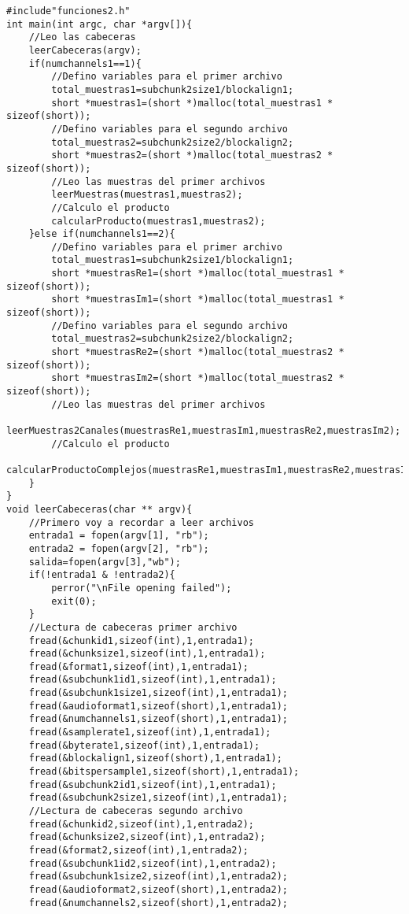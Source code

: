 \begin{lstlisting}[style=CStyle]
#include"funciones2.h"
int main(int argc, char *argv[]){
	//Leo las cabeceras
	leerCabeceras(argv);
	if(numchannels1==1){
		//Defino variables para el primer archivo
		total_muestras1=subchunk2size1/blockalign1;
		short *muestras1=(short *)malloc(total_muestras1 * sizeof(short));
		//Defino variables para el segundo archivo
		total_muestras2=subchunk2size2/blockalign2;
		short *muestras2=(short *)malloc(total_muestras2 * sizeof(short));
		//Leo las muestras del primer archivos
		leerMuestras(muestras1,muestras2);
		//Calculo el producto
		calcularProducto(muestras1,muestras2);
	}else if(numchannels1==2){
		//Defino variables para el primer archivo
		total_muestras1=subchunk2size1/blockalign1;
		short *muestrasRe1=(short *)malloc(total_muestras1 * sizeof(short));
		short *muestrasIm1=(short *)malloc(total_muestras1 * sizeof(short));
		//Defino variables para el segundo archivo
		total_muestras2=subchunk2size2/blockalign2;
		short *muestrasRe2=(short *)malloc(total_muestras2 * sizeof(short));
		short *muestrasIm2=(short *)malloc(total_muestras2 * sizeof(short));
		//Leo las muestras del primer archivos
		leerMuestras2Canales(muestrasRe1,muestrasIm1,muestrasRe2,muestrasIm2);
		//Calculo el producto
		calcularProductoComplejos(muestrasRe1,muestrasIm1,muestrasRe2,muestrasIm2);
	}
}
void leerCabeceras(char ** argv){
	//Primero voy a recordar a leer archivos
	entrada1 = fopen(argv[1], "rb");
	entrada2 = fopen(argv[2], "rb");
	salida=fopen(argv[3],"wb");
	if(!entrada1 & !entrada2){
		perror("\nFile opening failed");
		exit(0);
	}
	//Lectura de cabeceras primer archivo
	fread(&chunkid1,sizeof(int),1,entrada1);
	fread(&chunksize1,sizeof(int),1,entrada1);
	fread(&format1,sizeof(int),1,entrada1);
	fread(&subchunk1id1,sizeof(int),1,entrada1);
	fread(&subchunk1size1,sizeof(int),1,entrada1);
	fread(&audioformat1,sizeof(short),1,entrada1);
	fread(&numchannels1,sizeof(short),1,entrada1);
	fread(&samplerate1,sizeof(int),1,entrada1);
	fread(&byterate1,sizeof(int),1,entrada1);
	fread(&blockalign1,sizeof(short),1,entrada1);
	fread(&bitspersample1,sizeof(short),1,entrada1);
	fread(&subchunk2id1,sizeof(int),1,entrada1);
	fread(&subchunk2size1,sizeof(int),1,entrada1);
	//Lectura de cabeceras segundo archivo
	fread(&chunkid2,sizeof(int),1,entrada2);
	fread(&chunksize2,sizeof(int),1,entrada2);
	fread(&format2,sizeof(int),1,entrada2);
	fread(&subchunk1id2,sizeof(int),1,entrada2);
	fread(&subchunk1size2,sizeof(int),1,entrada2);
	fread(&audioformat2,sizeof(short),1,entrada2);
	fread(&numchannels2,sizeof(short),1,entrada2);

\end{lstlisting}
